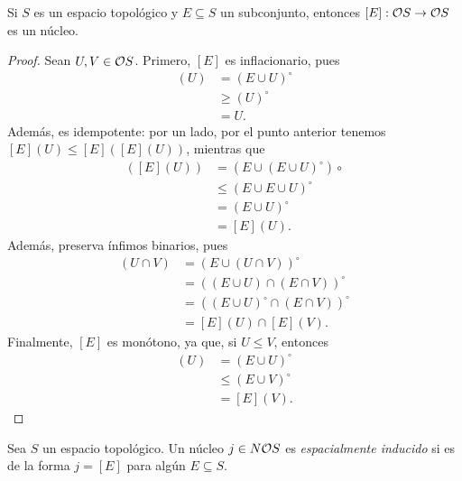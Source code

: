 \begin{prop}
  Si $S$ es un espacio topológico y $E\subseteq S$ un
  subconjunto, entonces $[E]:\cal OS\to\cal OS$ es un núcleo.
\end{prop}
\begin{proof}
  Sean $U,V\in\cal OS$.
  Primero, $[E]$ es inflacionario, pues
  \begin{align*}
    [E](U)
    &= (E\cup U)^\circ \\
    &\geq (U)^\circ \\
    &= U.
  \end{align*}
  Además, es idempotente: por un lado, por el punto anterior
  tenemos $[E](U)\leq[E]([E](U))$, mientras que
  \begin{align*}
    [E]([E](U))
    &= (E\cup (E\cup U)^\circ)\circ \\
    &\leq (E\cup E\cup U)^\circ \\
    &= (E\cup U)^\circ \\
    &= [E](U).
  \end{align*}
  Además, preserva ínfimos binarios, pues
  \begin{align*}
    [E](U\cap V)
    &= (E\cup(U\cap V))^\circ \\
    &= ((E\cup U)\cap(E\cap V))^\circ \\
    &= ((E\cup U)^\circ\cap(E\cap V))^\circ \\
    &= [E](U)\cap[E](V).
  \end{align*}
  Finalmente, $[E]$ es monótono, ya que, si $U\leq V$, entonces
  \begin{align*}
    [E](U)
    &= (E\cup U)^\circ \\
    &\leq (E\cup V)^\circ \\
    &= [E](V).
  \end{align*}
\end{proof}

\begin{defn}
  Sea $S$ un espacio topológico.
  Un núcleo $j\in N\cal O S$ es \emph{espacialmente
  inducido} si es de la forma $j=[E]$ para algún
  $E\subseteq S$.
\end{defn}

